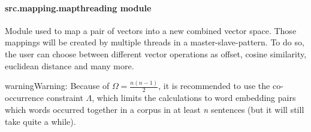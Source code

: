 \documentclass[letterpaper,10pt,english]{sphinxmanual}
\begin{document}
\paragraph{src.mapping.mapthreading module}
\label{src.mapping:src-mapping-mapthreading-module}\label{src.mapping:module-src.mapping.mapthreading}
Module used to map a pair of vectors into a new combined vector space. Those mappings will be created by multiple
threads in a master-slave-pattern. To do so, the user can choose between different vector operations as offset, cosine
similarity, euclidean distance and many more.

\begin{notice}{warning}{Warning:}
Because of \(\Omega=\frac{n(n-1)}{2}\), it is recommended to use the co-occurrence constraint
\(\Lambda\), which limits the calculations to word embedding pairs which words occurred together in a corpus in
at least \emph{n} sentences (but it will still take quite a while).
\end{notice}
\end{document}
